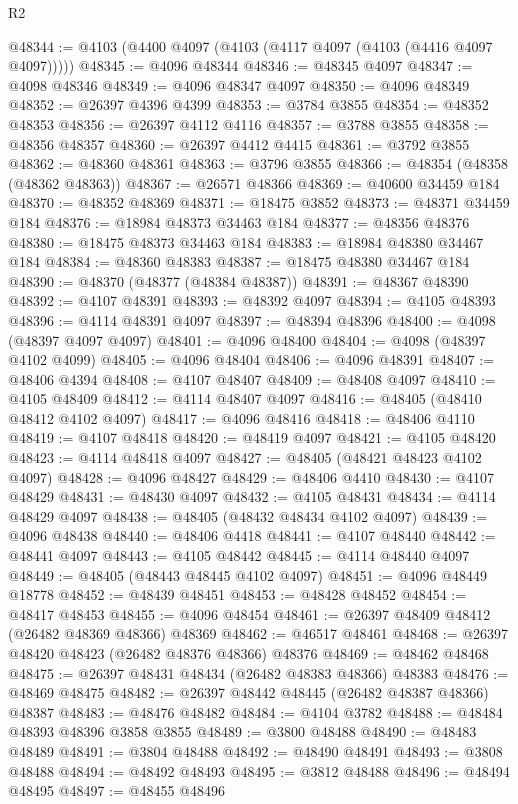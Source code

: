 \begin{lexlean}{R2}
\begin{coremodule}
@48344 := @4103 (@4400 @4097 (@4103 (@4117 @4097 (@4103 (@4416 @4097 @4097)))))
@48345 := @4096 @48344
@48346 := @48345 @4097
@48347 := @4098 @48346
@48349 := @4096 @48347 @4097
@48350 := @4096 @48349
@48352 := @26397 @4396 @4399
@48353 := @3784 @3855
@48354 := @48352 @48353
@48356 := @26397 @4112 @4116
@48357 := @3788 @3855
@48358 := @48356 @48357
@48360 := @26397 @4412 @4415
@48361 := @3792 @3855
@48362 := @48360 @48361
@48363 := @3796 @3855
@48366 := @48354 (@48358 (@48362 @48363))
@48367 := @26571 @48366
@48369 := @40600 @34459 @184
@48370 := @48352 @48369
@48371 := @18475 @3852
@48373 := @48371 @34459 @184
@48376 := @18984 @48373 @34463 @184
@48377 := @48356 @48376
@48380 := @18475 @48373 @34463 @184
@48383 := @18984 @48380 @34467 @184
@48384 := @48360 @48383
@48387 := @18475 @48380 @34467 @184
@48390 := @48370 (@48377 (@48384 @48387))
@48391 := @48367 @48390
@48392 := @4107 @48391
@48393 := @48392 @4097
@48394 := @4105 @48393
@48396 := @4114 @48391 @4097
@48397 := @48394 @48396
@48400 := @4098 (@48397 @4097 @4097)
@48401 := @4096 @48400
@48404 := @4098 (@48397 @4102 @4099)
@48405 := @4096 @48404
@48406 := @4096 @48391
@48407 := @48406 @4394
@48408 := @4107 @48407
@48409 := @48408 @4097
@48410 := @4105 @48409
@48412 := @4114 @48407 @4097
@48416 := @48405 (@48410 @48412 @4102 @4097)
@48417 := @4096 @48416
@48418 := @48406 @4110
@48419 := @4107 @48418
@48420 := @48419 @4097
@48421 := @4105 @48420
@48423 := @4114 @48418 @4097
@48427 := @48405 (@48421 @48423 @4102 @4097)
@48428 := @4096 @48427
@48429 := @48406 @4410
@48430 := @4107 @48429
@48431 := @48430 @4097
@48432 := @4105 @48431
@48434 := @4114 @48429 @4097
@48438 := @48405 (@48432 @48434 @4102 @4097)
@48439 := @4096 @48438
@48440 := @48406 @4418
@48441 := @4107 @48440
@48442 := @48441 @4097
@48443 := @4105 @48442
@48445 := @4114 @48440 @4097
@48449 := @48405 (@48443 @48445 @4102 @4097)
@48451 := @4096 @48449 @18778
@48452 := @48439 @48451
@48453 := @48428 @48452
@48454 := @48417 @48453
@48455 := @4096 @48454
@48461 := @26397 @48409 @48412 (@26482 @48369 @48366) @48369
@48462 := @46517 @48461
@48468 := @26397 @48420 @48423 (@26482 @48376 @48366) @48376
@48469 := @48462 @48468
@48475 := @26397 @48431 @48434 (@26482 @48383 @48366) @48383
@48476 := @48469 @48475
@48482 := @26397 @48442 @48445 (@26482 @48387 @48366) @48387
@48483 := @48476 @48482
@48484 := @4104 @3782
@48488 := @48484 @48393 @48396 @3858 @3855
@48489 := @3800 @48488
@48490 := @48483 @48489
@48491 := @3804 @48488
@48492 := @48490 @48491
@48493 := @3808 @48488
@48494 := @48492 @48493
@48495 := @3812 @48488
@48496 := @48494 @48495
@48497 := @48455 @48496

\end{coremodule}
\end{lexlean}
